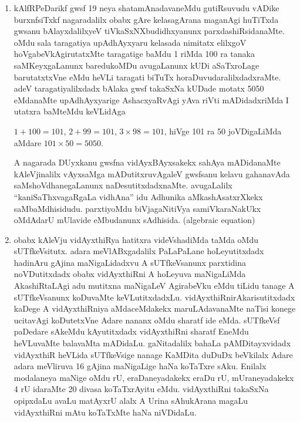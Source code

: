 \begin{enumerate}[\rm 1)]
\item kAlfRPeDarikf gwsf {\rm 19} neya shatamAnadavaneMdu gutiRsuvudu vADike burxnfsiTxkf nagaradalilx obabx gAre kelasagArana maganAgi huTiTxda gwsanu bAlayxdalilxyeV tiVkaSxNXbudidhxyanunx parxdashiRsidanaMte. oMdu sala taragatiya upAdhAyxyaru kelasada nimitatx elilxgoV hoVgabeVkAgirutatxMte taragatige baMdu {\rm 1} riMda {\rm 100} ra tanaka saMKeyxgaLanunx baredukoMDu avugaLanunx kUDi aSaTxroLage barutatxtxVne eMdu heVLi taragati biTuTx horaDuvudaralilxdadxraMte. adeV taragatiyalilxdadx bAlaka gwsf takaSxNa kUDade motatx {\rm 5050} eMdanaMte upAdhAyxyarige AshacxyaRvAgi yAva riVti mADidadxriMda I utatxra baMteMdu keVLidAga

$1+100=101$, $2+99=101$, $3\times 98=101$, hiVge {\rm 101} ra {\rm 50} joVDigaLiMda aMdare  $101\times 50=5050$.

A nagarada DUyxkanu gwsfna vidAyxBAyxsakekx sahAya mADidanaMte kAleVjinalilx vAyxsaMga mADutitxruvAgaleV gwsfsanu kelavu gahanavAda saMshoVdhanegaLanunx naDesutitxdadxnaMte. avugaLalilx ``kaniSaThxvagaRgaLa vidhAna'' idu Adhunika aMkashAsatxrXkekx saMbaMdhisidudu. parxtiyoMdu biVjagaNitiVya samiVkaraNakUkx oMdAdarU mUlavide eMbudanunx sAdhisida. {\rm (algebraic equation)}  

\item obabx kAleVju vidAyxthiRya hatitxra videVshadiMda taMda oMdu sUTfkeVsitutx. adara meVlABxgadalilx PaLaPaLane hoLeyutitxdadx hadinAru gAjina maNigaLidadxvu A sUTfkeVsanunx parxtidina noVDutitxdadx obabx vidAyxthiRni A hoLeyuva maNigaLiMda AkashiRtaLAgi adu mutitxna maNigaLeV AgirabeVku eMdu tiLidu tanage A sUTfkeVsanunx koDuvaMte keVLutitxdadxLu. vidAyxthiRnirAkarisutitxdadx kaDege A vidAyxthiRniya aMdaceMdakekx maruLAdavanaMte naTisi konege ucitavAgi koDutetxVne Adare nananx oMdu sharatf ide eMda. sUTfkeVsf paDedare sAkeMdu kAyutitxdadx vidAyxthiRni sharatf EneMdu heVLuvaMte balavaMta mADidaLu. gaNitadalilx bahaLa pAMDitayxvidadx vidAyxthiR heVLida sUTfkeVsige nanage  KaMDita duDuDx beVkilalx Adare adara meVliruva {\rm 16} gAjina maNigaLige haNa koTaTxre sAku. Enilalx modalaneya maNige oMdu rU, eraDaneyadakekx eraDu rU, mUraneyadakekx {\rm 4} rU idaraMte {\rm 20} divasa koTaTxrAyitu eMdu. vidAyxthiRni takaSxNa opipxdaLu avaLu matAyxrU alalx A Urina sAhukArana magaLu vidAyxthiRni mAtu koTaTxMte haNa niVDidaLu.


\end{enumerate}
